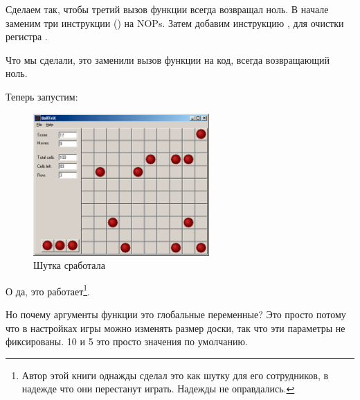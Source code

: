 Сделаем так, чтобы третий вызов функции всегда возвращал ноль.
В начале заменим три инструкции () 
на \ac{NOP}s.
Затем добавим инструкцию , для очистки регистра \EAX.



Что мы сделали, это заменили вызов функции  
на код, всегда возвращающий ноль.

\clearpage
Теперь запустим:

\begin{figure}[H]
\centering
\includegraphics[width=0.6\textwidth]{examples/lines/2.png}
\caption{Шутка сработала}
\end{figure}

О да, это работает\footnote{Автор этой книги однажды сделал это как 
шутку для его сотрудников, в надежде что они перестанут играть. 
Надежды не оправдались.}.

Но почему аргументы функции  это глобальные переменные?
Это просто потому что в настройках игры можно изменять размер доски, так что эти параметры не фиксированы.
10 и 5 это просто значения по умолчанию.
